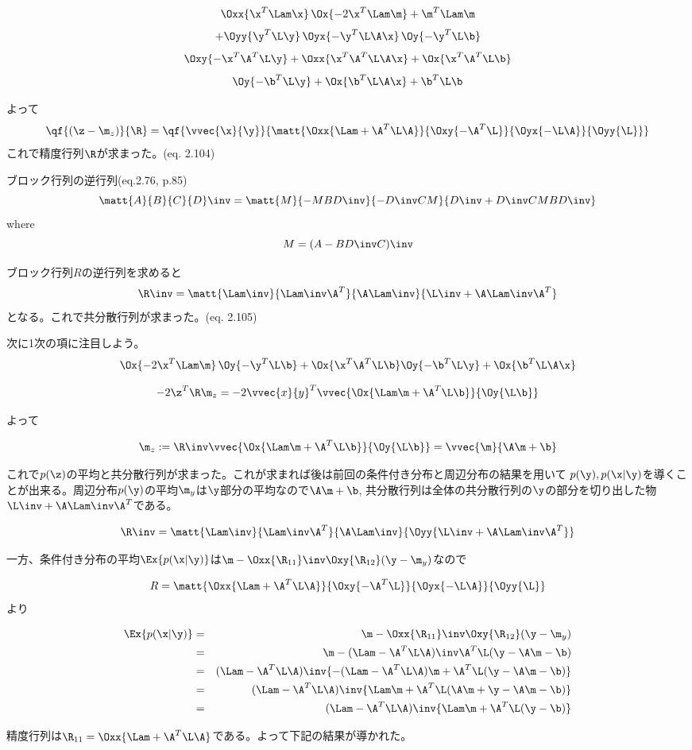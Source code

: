 \documentclass[a4paper]{jsarticle}
\begin{document}

\[ \Oxx{\x^T \Lam \x}  \, \Ox{- 2 \x^T \Lam \m} + \m^T \Lam \m \]
\[ + \Oyy{\y^T \L \y} \, \Oyx{- \y^T \L \A\x} \, \Oy{- \y^T \L \b} \]
\[ \Oxy{- \x^T\A^T \L \y} + \Oxx{\x^T\A^T \L \A\x} + \Ox{\x^T\A^T \L \b} \]
\[ \Oy{- \b^T \L \y} + \Ox{\b^T \L \A\x} + \b^T \L \b \]

よって
\[ \qf{(\z - \m_z)}{\R} = \qf{\vvec{\x}{\y}}{\matt{\Oxx{\Lam + \A^T\L\A}}{\Oxy{-\A^T\L}}{\Oyx{-\L\A}}{\Oyy{\L}}} \]
これで精度行列$\R$が求まった。(eq. 2.104)

\begin{itembox}[l]{ブロック行列の逆行列(eq.2.76, p.85)}
\[ \matt{A}{B}{C}{D}\inv = \matt{M}{-MBD\inv}{-D\inv CM}{D\inv+D\inv CMBD\inv}\]
where
\[ M = (A - BD\inv C)\inv \]
\end{itembox}

ブロック行列$R$の逆行列を求めると
\[\R\inv = \matt{\Lam\inv}{\Lam\inv\A^T}{\A\Lam\inv}{\L\inv+\A\Lam\inv\A^T} \]
となる。これで共分散行列が求まった。(eq. 2.105)

次に1次の項に注目しよう。
\[ \Ox{- 2 \x^T \Lam \m}  \, \Oy{- \y^T \L \b} + \Ox{\x^T\A^T \L \b} 
   \Oy{- \b^T \L \y} + \Ox{\b^T \L \A\x} \]


\[ - 2 \z^T\R\m_z = - 2 \vvec{x}{y}^T \vvec{\Ox{\Lam\m + \A^T\L\b}}{\Oy{\L\b}} \]

よって

\[ \m_z := \R\inv\vvec{\Ox{\Lam\m + \A^T\L\b}}{\Oy{\L\b}} = \vvec{\m}{\A\m + \b}  \]

これで$p(\z)$の平均と共分散行列が求まった。これが求まれば後は前回の条件付き分布と周辺分布の結果を用いて
$p(\y), p(\x|\y)$を導くことが出来る。周辺分布$p(\y)$の平均$\m_y$は$\y$部分の平均なので$\A\m + \b$, 共分散行列は全体の共分散行列の$\y$の部分を切り出した物$\L\inv+\A\Lam\inv\A^T$である。

\[\R\inv = \matt{\Lam\inv}{\Lam\inv\A^T}{\A\Lam\inv}{\Oyy{\L\inv+\A\Lam\inv\A^T}} \]

一方、条件付き分布の平均$\Ex{p(\x|\y)}$は$\m - \Oxx{\R_{11}}\inv \Oxy{\R_{12}}(\y - \m_y)$なので

\[ R = \matt{\Oxx{\Lam + \A^T\L\A}}{\Oxy{-\A^T\L}}{\Oyx{-\L\A}}{\Oyy{\L}}\]
より

\begin{eqnarray*}
\Ex{p(\x|\y)} 
&=&  \m - \Oxx{\R_{11}}\inv \Oxy{\R_{12}}(\y - \m_y) \\
&=& \m - (\Lam - \A^T\L\A)\inv \A^T\L (\y - \A\m - \b)   \\
&=&  (\Lam - \A^T\L\A)\inv \{ -(\Lam - \A^T\L\A)\m + \A^T\L (\y - \A\m - \b) \} \\
&=&  (\Lam - \A^T\L\A)\inv \{ \Lam\m + \A^T\L ( \A\m + \y - \A\m - \b ) \} \\
&=&  (\Lam - \A^T\L\A)\inv \{ \Lam\m + \A^T\L (\y - \b) \} 
\end{eqnarray*}

精度行列は$\R_{11}=\Oxx{\Lam + \A^T\L\A}$である。よって下記の結果が導かれた。

\BayesForGauss


\end{document}
